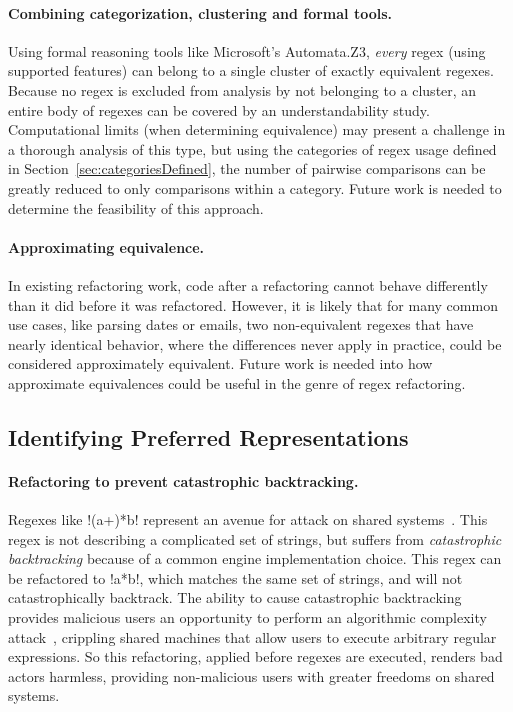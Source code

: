\paragraph{Combining categorization, clustering and formal tools.}  Using formal reasoning tools like Microsoft's Automata.Z3, \emph{every} regex (using supported features) can belong to a single cluster of exactly equivalent regexes. Because no regex is excluded from analysis by not belonging to a cluster, an entire body of regexes can be covered by an understandability study.
Computational limits (when determining equivalence) may present a challenge in a thorough analysis of this type, but using the categories of regex usage defined in Section~\ref{sec:categoriesDefined}, the number of pairwise comparisons can be greatly reduced to only comparisons within a category.  Future work is needed to determine the feasibility of this approach.

\paragraph{Approximating equivalence.}  In existing refactoring work, code after a refactoring cannot behave differently than it did before it was refactored.  However, it is likely that for many common use cases, like parsing dates or emails, two non-equivalent regexes that have nearly identical behavior, where the differences never apply in practice, could be considered approximately equivalent.  Future work is needed into how approximate equivalences could be useful in the genre of regex refactoring.

\subsection{Identifying Preferred Representations}
\paragraph{Refactoring to prevent catastrophic backtracking.}  Regexes like \cverb!(a+)*b! represent an avenue for attack on shared systems~.  This regex is not describing a complicated set of strings, but suffers from \emph{catastrophic backtracking} because of a common engine implementation choice.  This regex can be refactored to \cverb!a*b!, which matches the same set of strings, and will not catastrophically backtrack.  The ability to cause catastrophic backtracking provides malicious users an opportunity to perform an algorithmic complexity attack~, crippling shared machines that allow users to execute arbitrary regular expressions.  So this refactoring, applied before regexes are executed, renders bad actors harmless, providing non-malicious users with greater freedoms on shared systems.

